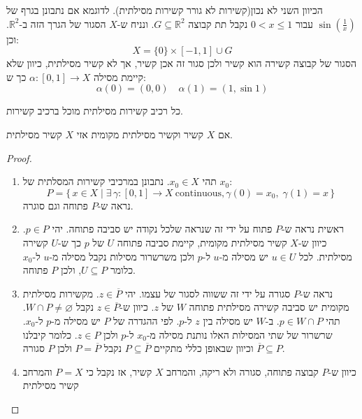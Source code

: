 \documentclass{tstextbook}
\begin{document}
\begin{remark}
הכיוון השני לא נכון(קשירות לא גורר קשירות מסילתית). לדוגמא אם נתבונן בגרף של \(\sin\left( \frac{1}{x} \right)\) עבור \(0<x\leq 1\) נקבל תת קבוצה \(G\subseteq \mathbb{R}^{2}\). ונניח ש-\(X\) הסגור של הגרך הזה ב-\(\mathbb{R}^{2}\). וכן:
$$X=\{ 0 \}\times[-1,1]\cup  G$$
הסגור של קבוצה קשירה הוא קשיר ולכן סגור זה אכן קשיר, אך לא קשיר מסילתית, כיוון שלא קיימת מסילה \(\alpha:[0,1]\to X\) כך ש:
$$\alpha(0)=(0,0)\quad \alpha(1)=(1,\sin 1)$$

\end{remark}
\begin{corollary}
כל רכיב קשירות מסילתית מוכל ברכיב קשירות.

\end{corollary}
\begin{proposition}
אם \(X\) קשיר וקשיר מסילתית מקומית אזי \(X\) קשיר מסילתית.

\end{proposition}
\begin{proof}
  \begin{enumerate}
    \item תהי \(x_{0} \in X\). נתבונן במרכיבי קשירות המסלתית של \(x_{0}\): 
$$P=\{\,x\in X\mid\exists\,\gamma:[0,1]\to X{\mathrm{~continuous}},\gamma(0)=x_{0},\;\gamma(1)=x\,\}$$
נראה ש-\(P\) פתוחה וגם סוגרה.


    \item ראשית נראה ש-\(P\) פתוח על ידי זה שנראה שלכל נקודה יש סביבה פתוחה. יהי \(p \in P\). כיוון ש-\(X\) קשיר מסילתית מקומית, קיימת סביבה פתוחה \(U\) של \(p\) כך ש-\(U\) קשירה מסילתית. לכל \(u \in U\) יש מסילה מ-\(u\) ל-\(p\) ולכן משרשרור מסילות נקבל מסילה מ-\(u\) ל-\(x_{0}\) כלומר \(U\subseteq P\), ולכן \(P\) פתוחה. 


    \item נראה ש-\(P\) סגורה על ידי זה ששווה לסגור של עצמו. יהי \(z \in \overline{P}\). מקשירות מסילתית מקומית יש סביבה קשירה מסילתית פתוחה \(W\) של \(z\). כיוון ש-\(z \in \overline{P}\) נקבל \(W \cap P \neq \varnothing\). תהי \(p \in W\cap P\). ב-\(W\) יש מסילה בין \(z\) ל-\(p\). לפי ההגדרה של \(P\) יש מסילה מ-\(p\) ל-\(x_{0}\). שרשרור של שתי המסילות האלו נותנת מסילה מ-\(x_{0}\) ל-\(p\) ולכן \(z \in P\). כלומר קיבלנו \(\overline{P}\subseteq P\) וכיוון שבאופן כללי מתקיים \(P\subseteq \overline{P}\) נקבל \(P=\overline{P}\) ולכן \(P\) סגורה. 


    \item כיוון ש-\(P\) קבוצה פתוחה, סגורה ולא ריקה, והמרחב \(X\) קשיר, אז נקבל כי \(P=X\) והמרחב קשיר מסילתית 


  \end{enumerate}
\end{proof}
\end{document}

